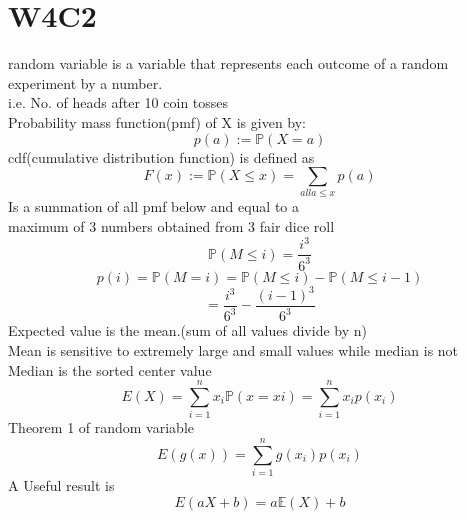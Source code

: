 \documentclass{article}
\begin{document}
\section{W4C2}
random variable is a variable that represents each outcome of a random experiment by a number.\\
i.e. No. of heads after 10 coin tosses\\
Probability mass function(pmf) of X is given by:
$$
p(a):=\mathbb P(X=a)
$$
cdf(cumulative distribution function) is defined as\\
$$
F(x):=\mathbb{P}(X\leq x)=\sum_{all a\leq x}p(a)
$$
Is a summation of all pmf below and equal to a\\
maximum of 3 numbers obtained from 3 fair dice roll
$$
\mathbb{P}(M\leq i)=\frac{i^3}{6^3}
$$
$$
p(i)=\mathbb{P}(M=i)=\mathbb{P}(M\leq i)-\mathbb{P}(M\leq i-1)
$$
$$
=\frac{i^3}{6^3}-\frac{(i-1)^3}{6^3}
$$
Expected value is the mean.(sum of all values divide by n)\\
Mean is sensitive to extremely large and small values while median is not\\
Median is the sorted center value\\
$$
E(X)=\sum_{i=1}^n x_i\mathbb P(x=xi)=\sum_{i=1}^n x_ip(x_i)
$$
Theorem 1 of random variable\\
$$
E(g(x))=\sum_{i=1}^ng(x_i)p(x_i)
$$
A Useful result is
$$
E(aX+b)=a\mathbb E(X)+b
$$
\end{document}
